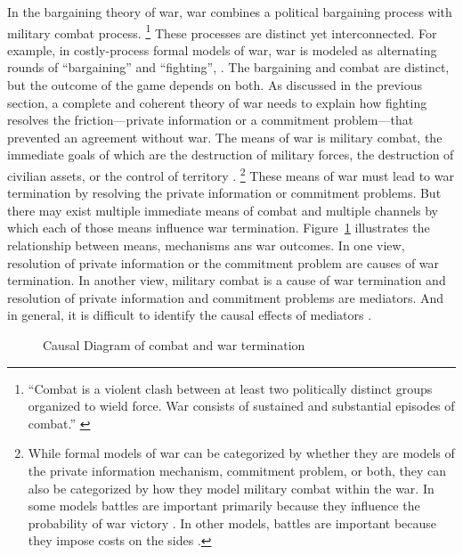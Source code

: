 In the bargaining theory of war, war combines a political bargaining process with military combat process.%
\footnote{%
  ``Combat is a violent clash between at least two politically distinct groups organized to wield force. War consists of sustained and substantial episodes of combat.'' \parencite{Reiter2003} %
} %
These processes are distinct yet interconnected. 
For example, in costly-process formal models of war, war is modeled as alternating rounds of ``bargaining'' and ``fighting'', \eg{}\textcite{Slantchev2003}.
The bargaining and combat are distinct, but the outcome of the game depends on both.
As discussed in the previous section, a complete and coherent theory of war needs to explain how fighting resolves the friction---private information or a commitment problem---that prevented an agreement without war.
The means of war is military combat, the immediate goals of which are the destruction of military forces, the destruction of civilian assets, or the control of territory \parencite[30]{Reiter2003}.%
\footnote{
While formal models of war can be categorized by whether they are models of the private information mechanism, commitment problem, or both, they can also be categorized by how they model military combat within the war.
In some models battles are important primarily because they influence the probability of war victory \parencites{Powell2004}{Wagner2000}{LeventogluSlantchev2007}{Slantchev2003}{SmithStam2004}.
In other models, battles are important because they impose costs on the sides \parencites{FilsonWerner2002}{Powell2004}{LeventogluSlantchev2007}. %
}
These means of war must lead to war termination by resolving the private information or commitment problems.
But there may exist multiple immediate means of combat and multiple channels by which each of those means influence war termination.
Figure~\ref{bonds:fig:combat-causal-diagram} illustrates the relationship between means, mechanisms ans war outcomes.
In one view, resolution of private information or the commitment problem are causes of war termination.
In another view, military combat is a cause of war termination and resolution of private information and commitment problems are mediators.
And in general, it is difficult to identify the causal effects of mediators \parencite{Keele2015a}.

\begin{figure}[!htpb]
  \centering
  
  \caption{Causal Diagram of combat and war termination}
  \label{bonds:fig:combat-causal-diagram}
\end{figure}

